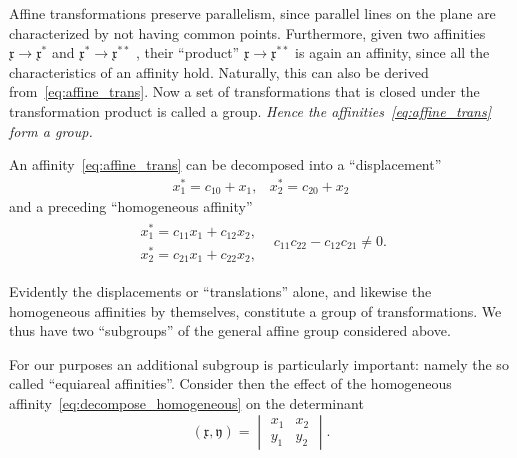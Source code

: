 \documentclass[11pt]{book} \usepackage{amssymb}
\newcommand{\myvec}[1]{\mathfrak{#1}}
\newcommand{\vecx}{\myvec{x}}
\newcommand{\vecy}{\myvec{y}}
\begin{document}
Affine transformations preserve parallelism, since parallel lines on the plane
are characterized by not having common points. Furthermore, given two 
affinities $\vecx\to\vecx^*$ and $\vecx^*\to\vecx^{**}$ , their
``product'' $\vecx\to\vecx^{**}$ is again an affinity, since all the
characteristics of an affinity hold. Naturally, this can also be derived 
from~\eqref{eq:affine_trans}. Now a set of transformations that is closed under
the transformation product is called a group. {\em Hence the 
affinities~\eqref{eq:affine_trans} form a group.}

An affinity~\eqref{eq:affine_trans} can be decomposed into a ``displacement''
\begin{equation}
  \label{eq:decompose_displacement}
  \begin{array}{ll}
    x_1^*=c_{10}+x_1,& x_2^*=c_{20}+x_2
  \end{array}
\end{equation}
and a preceding ``homogeneous affinity''
\begin{equation}
  \label{eq:decompose_homogeneous}
  \begin{array}{ll}
    \begin{array}{l}
      x_1^*=c_{11}x_1+c_{12}x_2,\\
      x_2^*=c_{21}x_1+c_{22}x_2,
    \end{array}
    & c_{11}c_{22}-c_{12}c_{21}\neq 0.
  \end{array}
\end{equation}

Evidently the displacements or ``translations'' alone, and likewise the 
homogeneous affinities by themselves, constitute a group of transformations.
We thus have two ``subgroups'' of the general affine group considered above.

For our purposes an additional subgroup is particularly important: namely the
so called ``equiareal affinities''. Consider then the effect of the homogeneous
affinity~\eqref{eq:decompose_homogeneous} on the determinant
\begin{equation}
  \label{eq:xy_determinant}
  (\vecx,\vecy)=\begin{vmatrix}x_1&x_2\\y_1&y_2\end{vmatrix}.
\end{equation}
\end{document}

